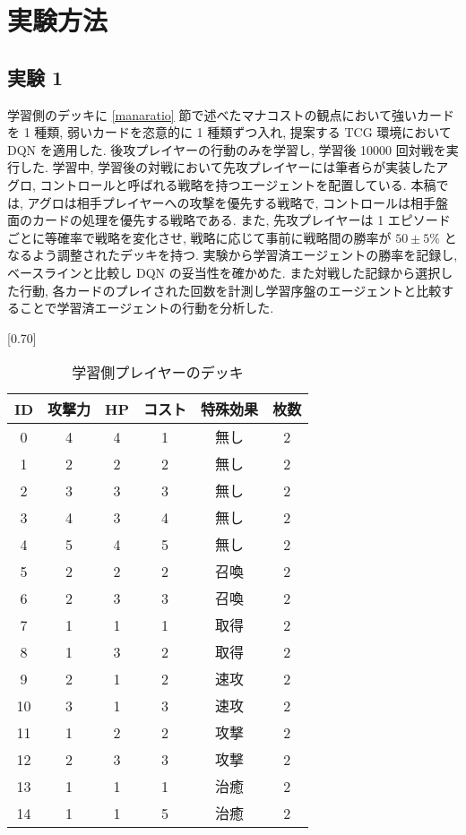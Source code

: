 \documentclass[twocolumn]{jarticle}
\begin{document}
\section{実験方法}
\subsection{実験 1}
学習側のデッキに \ref{manaratio} 節で述べたマナコストの観点において強いカードを 1 種類, 弱いカードを恣意的に 1 種類ずつ入れ, 提案する TCG 環境において DQN を適用した. 後攻プレイヤーの行動のみを学習し, 学習後 10000 回対戦を実行した. 学習中, 学習後の対戦において先攻プレイヤーには筆者らが実装したアグロ, コントロールと呼ばれる戦略を持つエージェントを配置している. 本稿では, アグロは相手プレイヤーへの攻撃を優先する戦略で, コントロールは相手盤面のカードの処理を優先する戦略である. また, 先攻プレイヤーは 1 エピソードごとに等確率で戦略を変化させ, 戦略に応じて事前に戦略間の勝率が $50 \pm 5\%$ となるよう調整されたデッキを持つ. 
実験から学習済エージェントの勝率を記録し, ベースラインと比較し DQN の妥当性を確かめた. また対戦した記録から選択した行動, 各カードのプレイされた回数を計測し学習序盤のエージェントと比較することで学習済エージェントの行動を分析した.
\begin{table}[t]
   \centering
   \caption{学習側プレイヤーのデッキ}
   \label{table:OPdeck}
   \vspace{-0.3cm}
   \scalebox{0.70}[0.70]{
     \begin{tabular}{|c|c|c|c|c|c|}
       \hline
       ID & 攻撃力 & HP & コスト & 特殊効果 & 枚数 \\ \hline
       0 & 4 & 4 & 1 & 無し & 2 \\ \hline
       1 & 2 & 2 & 2 & 無し & 2 \\ \hline
       2 & 3 & 3 & 3 & 無し & 2 \\ \hline
       3 & 4 & 3 & 4 & 無し & 2 \\ \hline
       4 & 5 & 4 & 5 & 無し & 2 \\ \hline
       5 & 2 & 2 & 2 & 召喚 & 2 \\ \hline
       6 & 2 & 3 & 3 & 召喚 & 2 \\ \hline
       7 & 1 & 1 & 1 & 取得 & 2 \\ \hline
       8 & 1 & 3 & 2 & 取得 & 2 \\ \hline
       9 & 2 & 1 & 2 & 速攻 & 2 \\ \hline
       10 & 3 & 1 & 3 & 速攻 & 2 \\ \hline
       11 & 1 & 2 & 2 & 攻撃 & 2 \\ \hline
       12 & 2 & 3 & 3 & 攻撃 & 2 \\ \hline
       13 & 1 & 1 & 1 & 治癒 & 2 \\ \hline
       14 & 1 & 1 & 5 & 治癒 & 2 \\ \hline
       \end{tabular}
   }
   
   \end{table}
\end{document}
